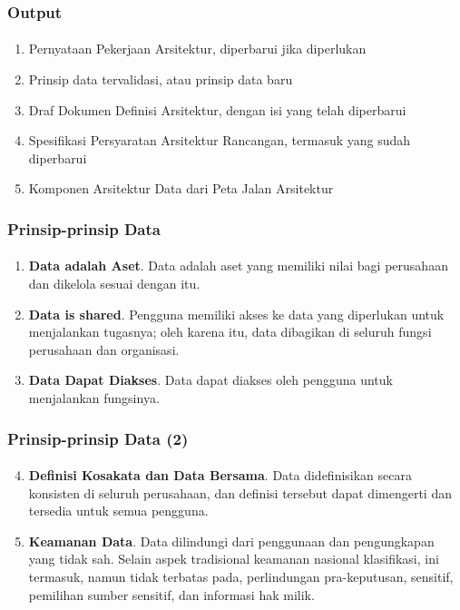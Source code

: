 \documentclass[aspectratio=169, table]{beamer}
\begin{document}
	\begin{frame}
		\frametitle{Output}
		\framesubtitle{\hspace{1cm}}
		\begin{enumerate}
			\item Pernyataan Pekerjaan Arsitektur, diperbarui jika diperlukan
			\item Prinsip data tervalidasi, atau prinsip data baru
			\item Draf Dokumen Definisi Arsitektur, dengan isi yang telah diperbarui
			\item Spesifikasi Persyaratan Arsitektur Rancangan, termasuk yang sudah diperbarui
			\item Komponen Arsitektur Data dari Peta Jalan Arsitektur
		\end{enumerate}
	\end{frame}
	
	\begin{frame}
		\frametitle{Prinsip-prinsip Data}
		\framesubtitle{\hspace{1cm}}
		\begin{enumerate}
			\item \textbf{Data adalah Aset}.
			Data adalah aset yang memiliki nilai bagi perusahaan dan dikelola sesuai dengan itu.
			\item \textbf{Data is shared}.
			Pengguna memiliki akses ke data yang diperlukan untuk menjalankan tugasnya; oleh karena itu, data dibagikan di seluruh fungsi perusahaan
			dan organisasi.
			\item \textbf{Data Dapat Diakses}. Data dapat diakses oleh pengguna untuk menjalankan fungsinya.
		\end{enumerate}
	\end{frame}
	
	\begin{frame}
		\frametitle{Prinsip-prinsip Data (2)}
		\framesubtitle{\hspace{1cm}}
		\begin{enumerate}
			\setcounter{enumi}{3}
			\item \textbf{Definisi Kosakata dan Data Bersama}. Data didefinisikan secara konsisten di seluruh perusahaan, dan definisi tersebut dapat dimengerti dan tersedia untuk semua pengguna.
			\item \textbf{Keamanan Data}.
			Data dilindungi dari penggunaan dan pengungkapan yang tidak sah. Selain aspek tradisional keamanan nasional
			klasifikasi, ini termasuk, namun tidak terbatas pada, perlindungan pra-keputusan, sensitif, pemilihan sumber sensitif, dan
			informasi hak milik.
		\end{enumerate}
	\end{frame}
	
\end{document}
